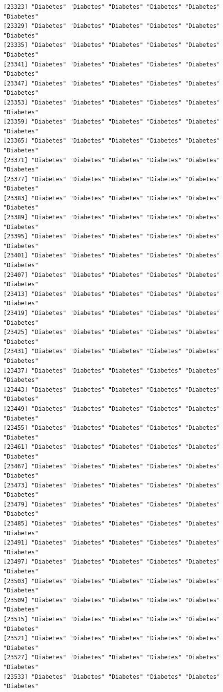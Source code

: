 \documentclass[
  letterpaper,
  DIV=11,
  numbers=noendperiod]{scrartcl}
\begin{document}
\begin{verbatim}
[23323] "Diabetes" "Diabetes" "Diabetes" "Diabetes" "Diabetes" "Diabetes"
[23329] "Diabetes" "Diabetes" "Diabetes" "Diabetes" "Diabetes" "Diabetes"
[23335] "Diabetes" "Diabetes" "Diabetes" "Diabetes" "Diabetes" "Diabetes"
[23341] "Diabetes" "Diabetes" "Diabetes" "Diabetes" "Diabetes" "Diabetes"
[23347] "Diabetes" "Diabetes" "Diabetes" "Diabetes" "Diabetes" "Diabetes"
[23353] "Diabetes" "Diabetes" "Diabetes" "Diabetes" "Diabetes" "Diabetes"
[23359] "Diabetes" "Diabetes" "Diabetes" "Diabetes" "Diabetes" "Diabetes"
[23365] "Diabetes" "Diabetes" "Diabetes" "Diabetes" "Diabetes" "Diabetes"
[23371] "Diabetes" "Diabetes" "Diabetes" "Diabetes" "Diabetes" "Diabetes"
[23377] "Diabetes" "Diabetes" "Diabetes" "Diabetes" "Diabetes" "Diabetes"
[23383] "Diabetes" "Diabetes" "Diabetes" "Diabetes" "Diabetes" "Diabetes"
[23389] "Diabetes" "Diabetes" "Diabetes" "Diabetes" "Diabetes" "Diabetes"
[23395] "Diabetes" "Diabetes" "Diabetes" "Diabetes" "Diabetes" "Diabetes"
[23401] "Diabetes" "Diabetes" "Diabetes" "Diabetes" "Diabetes" "Diabetes"
[23407] "Diabetes" "Diabetes" "Diabetes" "Diabetes" "Diabetes" "Diabetes"
[23413] "Diabetes" "Diabetes" "Diabetes" "Diabetes" "Diabetes" "Diabetes"
[23419] "Diabetes" "Diabetes" "Diabetes" "Diabetes" "Diabetes" "Diabetes"
[23425] "Diabetes" "Diabetes" "Diabetes" "Diabetes" "Diabetes" "Diabetes"
[23431] "Diabetes" "Diabetes" "Diabetes" "Diabetes" "Diabetes" "Diabetes"
[23437] "Diabetes" "Diabetes" "Diabetes" "Diabetes" "Diabetes" "Diabetes"
[23443] "Diabetes" "Diabetes" "Diabetes" "Diabetes" "Diabetes" "Diabetes"
[23449] "Diabetes" "Diabetes" "Diabetes" "Diabetes" "Diabetes" "Diabetes"
[23455] "Diabetes" "Diabetes" "Diabetes" "Diabetes" "Diabetes" "Diabetes"
[23461] "Diabetes" "Diabetes" "Diabetes" "Diabetes" "Diabetes" "Diabetes"
[23467] "Diabetes" "Diabetes" "Diabetes" "Diabetes" "Diabetes" "Diabetes"
[23473] "Diabetes" "Diabetes" "Diabetes" "Diabetes" "Diabetes" "Diabetes"
[23479] "Diabetes" "Diabetes" "Diabetes" "Diabetes" "Diabetes" "Diabetes"
[23485] "Diabetes" "Diabetes" "Diabetes" "Diabetes" "Diabetes" "Diabetes"
[23491] "Diabetes" "Diabetes" "Diabetes" "Diabetes" "Diabetes" "Diabetes"
[23497] "Diabetes" "Diabetes" "Diabetes" "Diabetes" "Diabetes" "Diabetes"
[23503] "Diabetes" "Diabetes" "Diabetes" "Diabetes" "Diabetes" "Diabetes"
[23509] "Diabetes" "Diabetes" "Diabetes" "Diabetes" "Diabetes" "Diabetes"
[23515] "Diabetes" "Diabetes" "Diabetes" "Diabetes" "Diabetes" "Diabetes"
[23521] "Diabetes" "Diabetes" "Diabetes" "Diabetes" "Diabetes" "Diabetes"
[23527] "Diabetes" "Diabetes" "Diabetes" "Diabetes" "Diabetes" "Diabetes"
[23533] "Diabetes" "Diabetes" "Diabetes" "Diabetes" "Diabetes" "Diabetes"

\end{verbatim}
\end{document}

